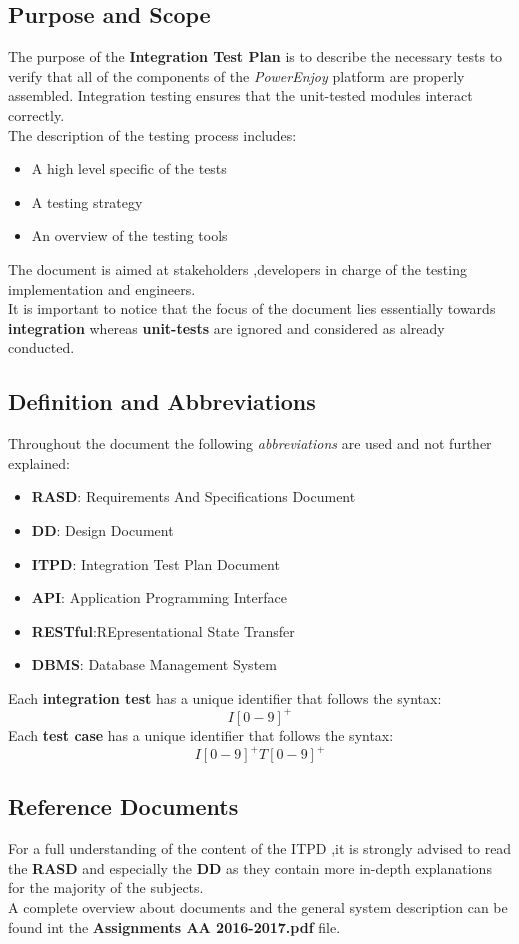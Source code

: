 \subsection{Purpose and Scope}
The purpose of the \textbf{Integration Test Plan} is to describe the necessary tests to verify that all of the components of the \emph{PowerEnjoy} platform are properly assembled. Integration testing ensures that the unit-tested modules interact correctly.\\
The description of the testing process includes:
\begin{itemize}
\item A high level specific of the tests
\item A testing strategy
\item An overview of the testing tools
\end{itemize}
The document is aimed at stakeholders ,developers in charge of the testing implementation and engineers.\\
It is important to notice that the focus of the document lies essentially towards \textbf{integration} whereas \textbf{unit-tests} are ignored and considered as already conducted. 
\subsection{Definition and Abbreviations}
Throughout the document the following \textit{abbreviations} are used and not further explained:
\begin{itemize}
\item \textbf{RASD}: Requirements And Specifications Document
\item \textbf{DD}: Design Document
\item \textbf{ITPD}: Integration Test Plan Document
\item \textbf{API}: Application Programming Interface
\item \textbf{RESTful}:REpresentational State Transfer
\item \textbf{DBMS}: Database Management System
\end{itemize}
Each \textbf{integration test} has a unique identifier that follows the syntax: $$ I[0-9]^+$$
Each \textbf{test case} has a unique identifier that follows the syntax: $$I[0-9]^+T[0-9]^+$$
 
\subsection{Reference Documents}
For a full understanding of the content of the ITPD ,it is strongly advised to read the \textbf{RASD} and especially the \textbf{DD} as they contain more in-depth explanations for the majority of the subjects.\\
A complete overview about documents and the general system description can be found int the \textbf{Assignments AA 2016-2017.pdf} file.



